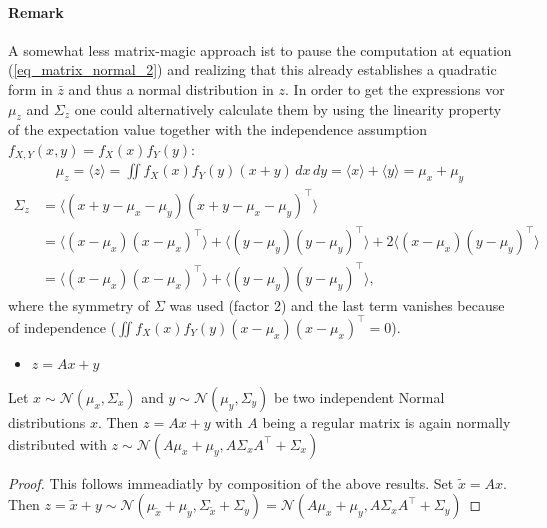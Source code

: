 \paragraph*{Remark} 
A somewhat less matrix-magic approach ist to pause the computation at equation (\ref{eq_matrix_normal_2}) and realizing that this already establishes a quadratic form in $\bar z$ and thus a normal distribution in $z$. In order to get the expressions vor $\mu_z$ and $\Sigma_z$ one could alternatively calculate them by using the linearity property of the expectation value together with the independence assumption $f_{X,Y}(x,y)=f_X(x)f_Y(y)$:
\begin{align}
\mu_z = \langle z \rangle =\iint f_X(x)f_Y(y) (x+y)\, dx\,dy =\langle x \rangle + \langle y \rangle  = \mu_x + \mu_y
\end{align}
\begin{align}
\Sigma_z &= \langle(x+y-\mu_x - \mu_y)(x+y-\mu_x - \mu_y)^\intercal\rangle  \\ 
&= \langle (x-\mu_x)(x - \mu_x)^\intercal \rangle +  \langle (y-\mu_y)(y - \mu_y)^\intercal \rangle + 2\langle (x-\mu_x)(y - \mu_y)^\intercal \rangle  \\
&= \langle (x-\mu_x)(x - \mu_x)^\intercal \rangle +  \langle (y-\mu_y)(y - \mu_y)^\intercal \rangle,
\end{align}
where the symmetry of $\Sigma$ was used (factor 2) and the last term vanishes because of independence ($\iint f_X(x)f_Y(y) (x-\mu_x)(x-\mu_x)^\intercal = 0$).
\begin{itemize}
\item $z=Ax + y$
\end{itemize}
Let $x\sim \mathcal{N}(\mu_x, \Sigma_x)$ and $y\sim \mathcal{N}(\mu_y, \Sigma_y)$ be two independent Normal distributions $x$. Then $z=Ax+y$  with $A$ being a regular matrix is again normally distributed with $z \sim \mathcal{N}(A\mu_x + \mu_y,  A\Sigma_xA^\intercal+\Sigma_x)$

\begin{proof}
This follows immeadiatly by composition of the above results. Set $\tilde x =  Ax$. Then $z = \tilde x + y \sim \mathcal{N}(\mu_{\tilde{x}} + \mu_y, \Sigma_{\tilde{x}} + \Sigma_y ) = \mathcal{N} (A\mu_{x} + \mu_y, A \Sigma_{x} A^\intercal + \Sigma_y ) $
\end{proof}